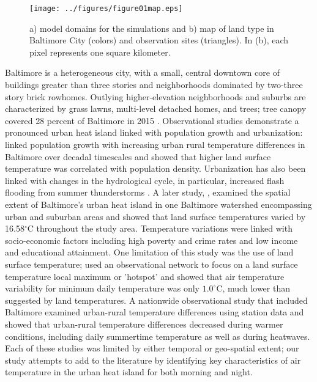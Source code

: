 \documentclass[draft,linenumbers]{agujournal}
\begin{document}
\begin{figure}[h]
\centering
\texttt{[image: ../figures/figure01map.eps]}
\caption{a) model domains for the simulations and b) map of land type in Baltimore City (colors) and observation sites (triangles). In (b), each pixel represents one square kilometer.}
\label{fig:map}
 \end{figure}
 
Baltimore is a heterogeneous city, with a small, central downtown core of buildings greater than three stories and  neighborhoods dominated by two-three story brick rowhomes. Outlying higher-elevation neighborhoods and suburbs are characterized by grass lawns, multi-level detached homes, and trees; tree canopy covered 28 percent of Baltimore in 2015 \cite{grove2011urban}. 
Observational studies demonstrate a pronounced urban heat island linked with population growth and urbanization: \cite{brazel2000tale} linked population growth with increasing urban rural temperature differences in Baltimore over decadal timescales and showed that higher land surface temperature was correlated with population density. 
Urbanization has also been linked with changes in the hydrological cycle, in particular,    %
increased flash flooding from summer thunderstorms \citep{ntelekos2007climatological}.   
 A later study,
\cite{Huang20111753}, examined the spatial extent of Baltimore's urban heat island in one Baltimore watershed encompassing urban and suburban areas and showed that land surface temperatures varied by 16.58$^\circ$C throughout the study area. Temperature variations were linked with socio-economic factors including high poverty and crime rates and low income and educational attainment. One limitation of this study was the use of land surface temperature; \cite{scott2017intraurban} used an observational network to focus on a land surface temperature local maximum or 'hotspot' and showed that air temperature variability for minimum daily temperature was only $1.0^\circ$C, much lower than suggested by land temperatures. 
A nationwide observational study that included Baltimore \citep{scott2018reduced} examined urban-rural temperature differences using station data and showed that urban-rural temperature differences decreased during warmer conditions, including daily summertime temperature as well as during heatwaves.  Each of these studies was limited by either temporal or geo-spatial extent; our study attempts to add to the literature by identifying key characteristics of air temperature in the urban heat island for both morning and night. 
\end{document}
